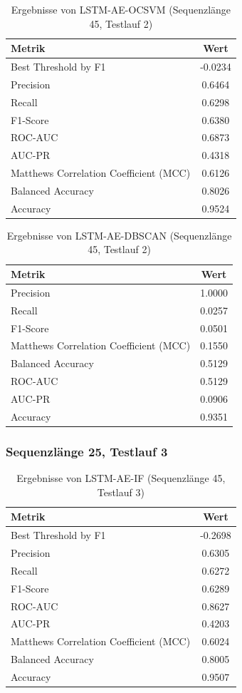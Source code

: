 \documentclass[a4paper,12pt]{article}
\begin{document}
\begin{table}[H]
	\centering
	\caption{Ergebnisse von LSTM-AE-OCSVM (Sequenzlänge 45, Testlauf 2)}
	\begin{tabular}{lc}
		\hline
		Metrik & Wert \\
		\hline
		Best Threshold by F1 & -0.0234 \\
		Precision & 0.6464 \\
		Recall & 0.6298 \\
		F1-Score & 0.6380 \\
		ROC-AUC & 0.6873 \\
		AUC-PR & 0.4318 \\
		Matthews Correlation Coefficient (MCC) & 0.6126 \\
		Balanced Accuracy & 0.8026 \\
		Accuracy & 0.9524 \\
		\hline
	\end{tabular}
\end{table}

\begin{table}[H]
	\centering
	\caption{Ergebnisse von LSTM-AE-DBSCAN (Sequenzlänge 45, Testlauf 2)}
	\begin{tabular}{lc}
		\hline
		Metrik & Wert \\
		\hline
		Precision & 1.0000 \\
		Recall & 0.0257 \\
		F1-Score & 0.0501 \\
		Matthews Correlation Coefficient (MCC) & 0.1550 \\
		Balanced Accuracy & 0.5129 \\
		ROC-AUC & 0.5129 \\
		AUC-PR & 0.0906 \\
		Accuracy & 0.9351 \\
		\hline
	\end{tabular}
\end{table}


\subsubsection{Sequenzlänge 25, Testlauf 3}
\begin{table}[H]
	\centering
	\caption{Ergebnisse von LSTM-AE-IF (Sequenzlänge 45, Testlauf 3)}
	\begin{tabular}{lc}
		\hline
		Metrik & Wert \\
		\hline
		Best Threshold by F1 & -0.2698 \\
		Precision & 0.6305 \\
		Recall & 0.6272 \\
		F1-Score & 0.6289 \\
		ROC-AUC & 0.8627 \\
		AUC-PR & 0.4203 \\
		Matthews Correlation Coefficient (MCC) & 0.6024 \\
		Balanced Accuracy & 0.8005 \\
		Accuracy & 0.9507 \\
		\hline
	\end{tabular}
\end{table}
\end{document}

